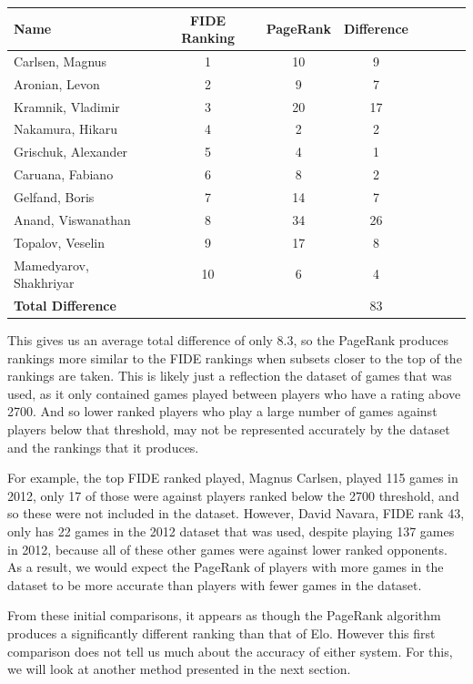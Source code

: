 \documentclass[pdftex,11pt,a4paper]{report}
\begin{document}
\begin{singlespace}
\begin{tabular}{l*{6}{c}r}
Name & FIDE Ranking & PageRank & Difference \\
\hline
Carlsen, Magnus & 1 & 10 & 9  \\ 
Aronian, Levon & 2 & 9 & 7  \\ 
Kramnik, Vladimir & 3 & 20 & 17  \\ 
Nakamura, Hikaru & 4 & 2 & 2  \\ 
Grischuk, Alexander & 5 & 4 & 1  \\ 
Caruana, Fabiano & 6 & 8 & 2  \\ 
Gelfand, Boris & 7 & 14 & 7  \\ 
Anand, Viswanathan & 8 & 34 & 26  \\ 
Topalov, Veselin & 9 & 17 & 8  \\ 
Mamedyarov, Shakhriyar & 10 & 6 & 4  \\ 
\textbf{Total Difference} & & &  83
\end{tabular}
\end{singlespace}

This gives us an average total difference of only 8.3, so the PageRank produces rankings more similar
to the FIDE rankings when subsets closer to the top of the rankings are taken. This is likely just a 
reflection the dataset of games that was used, as it only contained games played between
players who have a rating above 2700. And so lower ranked players who play a large number of games
against players below that threshold, may not be represented accurately by the dataset and the rankings that it produces.

For example, the top FIDE ranked played, Magnus Carlsen, played 115 games in 2012, only 17 of those were against players ranked
below the 2700 threshold, and so these were not included in the dataset. 
However, David Navara, FIDE rank 43, only has 22 games in the 2012 dataset that was used, despite
playing 137 games in 2012, because all of these other games were against lower ranked opponents.
As a result, we would expect the PageRank of players with more games in the dataset to be more
accurate than players with fewer games in the dataset.

From these initial comparisons, it appears as though the PageRank algorithm produces a significantly different
ranking than that of Elo. However this first comparison does not tell us much about the accuracy of either system.
For this, we will look at another method presented in the next section.
\end{document}

